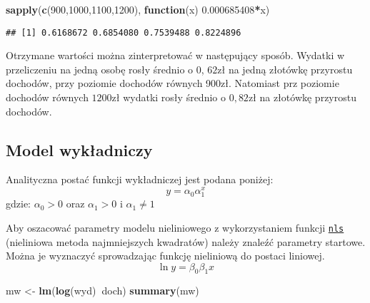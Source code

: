 \documentclass[polish,]{book}
\newenvironment{Shaded}{\begin{snugshade}}{\end{snugshade}}
\newcommand{\ControlFlowTok}[1]{\textcolor[rgb]{0.13,0.29,0.53}{\textbf{#1}}}
\newcommand{\DecValTok}[1]{\textcolor[rgb]{0.00,0.00,0.81}{#1}}
\newcommand{\FloatTok}[1]{\textcolor[rgb]{0.00,0.00,0.81}{#1}}
\newcommand{\KeywordTok}[1]{\textcolor[rgb]{0.13,0.29,0.53}{\textbf{#1}}}
\newcommand{\NormalTok}[1]{#1}
\newcommand{\OperatorTok}[1]{\textcolor[rgb]{0.81,0.36,0.00}{\textbf{#1}}}
\newcommand{\StringTok}[1]{\textcolor[rgb]{0.31,0.60,0.02}{#1}}
\begin{document}
\begin{Shaded}
\begin{Highlighting}[]
\KeywordTok{sapply}\NormalTok{(}\KeywordTok{c}\NormalTok{(}\DecValTok{900}\NormalTok{,}\DecValTok{1000}\NormalTok{,}\DecValTok{1100}\NormalTok{,}\DecValTok{1200}\NormalTok{), }\ControlFlowTok{function}\NormalTok{(x) }\FloatTok{0.000685408}\OperatorTok{*}\NormalTok{x)}
\end{Highlighting}
\end{Shaded}

\begin{verbatim}
## [1] 0.6168672 0.6854080 0.7539488 0.8224896
\end{verbatim}

Otrzymane wartości można zinterpretować w następujący sposób. Wydatki w przeliczeniu na jedną osobę rosły średnio o 0, \(62\)zł na jedną złotówkę przyrostu dochodów,
przy poziomie dochodów równych 900zł. Natomiast prz poziomie dochodów równych
\(1200\)zł wydatki rosły średnio o \(0,82\)zł na złotówkę przyrostu dochodów.

\hypertarget{part_13.3.2}{%
\subsection{Model wykładniczy}\label{part_13.3.2}}

Analityczna postać funkcji wykładniczej jest podana poniżej:
\begin{equation}
y=\alpha_0\alpha_1^x
\label{eq:wz1328}
\end{equation}
gdzie: \(\alpha_0>0\) oraz \(\alpha_1>0\) i \(\alpha_1\neq 1\)

Aby oszacować parametry modelu nieliniowego z wykorzystaniem funkcji \href{https://rdrr.io/r/stats/nls.html}{\texttt{nls}}
(nieliniowa metoda najmniejszych kwadratów) należy znaleźć parametry startowe.
Można je wyznaczyć sprowadzając funkcję nieliniową do postaci liniowej.
\begin{equation}
\ln y = \beta_0 \beta_1 x
\label{eq:wz1329}
\end{equation}

\begin{Shaded}
\begin{Highlighting}[]
\NormalTok{mw <-}\StringTok{ }\KeywordTok{lm}\NormalTok{(}\KeywordTok{log}\NormalTok{(wyd)}\OperatorTok{~}\NormalTok{doch)}
\KeywordTok{summary}\NormalTok{(mw)}
\end{Highlighting}
\end{Shaded}
\end{document}
